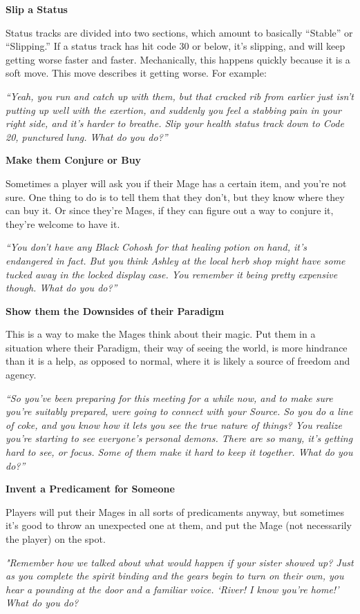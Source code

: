 \documentclass[
  oneside,
  statementpaper,
  9pt]{memoir}
\begin{document}
\textbf{Slip a Status}

Status tracks are divided into two sections, which amount to basically
``Stable'' or ``Slipping.'' If a status track has hit code 30 or below,
it's slipping, and will keep getting worse faster and faster.
Mechanically, this happens quickly because it is a soft move. This move
describes it getting worse. For example:

\emph{``Yeah, you run and catch up with them, but that cracked rib from
earlier just isn't putting up well with the exertion, and suddenly you
feel a stabbing pain in your right side, and it's harder to breathe.
Slip your health status track down to Code 20, punctured lung. What do
you do?''}

\textbf{Make them Conjure or Buy}

Sometimes a player will ask you if their Mage has a certain item, and
you're not sure. One thing to do is to tell them that they don't, but
they know where they can buy it. Or since they're Mages, if they can
figure out a way to conjure it, they're welcome to have it.

\emph{``You don't have any Black Cohosh for that healing potion on hand,
it's endangered in fact. But you think Ashley at the local herb shop
might have some tucked away in the locked display case. You remember it
being pretty expensive though. What do you do?''}

\textbf{Show them the Downsides of their Paradigm}

This is a way to make the Mages think about their magic. Put them in a
situation where their Paradigm, their way of seeing the world, is more
hindrance than it is a help, as opposed to normal, where it is likely a
source of freedom and agency.

\emph{``So you've been preparing for this meeting for a while now, and
to make sure you're suitably prepared, were going to connect with your
Source. So you do a line of coke, and you know how it lets you see the
true nature of things? You realize you're starting to see everyone's
personal demons. There are so many, it's getting hard to see, or focus.
Some of them make it hard to keep it together. What do you do?''}

\textbf{Invent a Predicament for Someone}

Players will put their Mages in all sorts of predicaments anyway, but
sometimes it's good to throw an unexpected one at them, and put the Mage
(not necessarily the player) on the spot.

\emph{"Remember how we talked about what would happen if your sister
showed up? Just as you complete the spirit binding and the gears begin
to turn on their own, you hear a pounding at the door and a familiar
voice. `River! I know you're home!' What do you do?}
\end{document}
